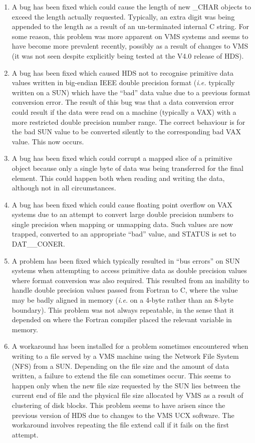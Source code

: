 \begin{enumerate}
\item
A bug has been fixed which could cause the length of new \_CHAR objects to
exceed the length actually requested. Typically, an extra digit was being
appended to the length as a result of an un-terminated internal C string. For
some reason, this problem was more apparent on VMS systems and seems to have
become more prevalent recently, possibly as a result of changes to VMS (it was
not seen despite explicitly being tested at the V4.0 release of HDS).

\item
A bug has been fixed which caused HDS not to recognise primitive data values
written in big-endian IEEE double precision format ({\em i.e.} typically written
on a SUN) which have the ``bad'' data value due to a previous format conversion
error. The result of this bug was that a data conversion error could result if
the data were read on a machine (typically a VAX) with a more restricted double
precision number range. The correct behaviour is for the bad SUN value to be
converted silently to the corresponding bad VAX value. This now occurs.

\item
A bug has been fixed which could corrupt a mapped slice of a primitive object
because only a single byte of data was being transferred for the final element.
This could happen both when reading and writing the data, although not in all
circumstances.

\item
A bug has been fixed which could cause floating point overflow on VAX systems
due to an attempt to convert large double precision numbers to single precision
when mapping or unmapping data. Such values are now trapped,  converted to an
appropriate ``bad'' value, and STATUS is set to DAT\_\_CONER.

\item
A problem has been fixed which typically resulted in ``bus errors'' on SUN
systems when attempting to access primitive data as double precision values
where format conversion was also required. This resulted from an inability to
handle double precision values passed from Fortran to C, where the value may be
badly aligned in memory ({\em i.e.} on a 4-byte rather than an 8-byte boundary).
This problem was not always repeatable, in the sense that it depended on where
the Fortran compiler placed the relevant variable in memory.

\item
A workaround has been installed for a problem sometimes encountered when writing
to a file served by a VMS machine using the Network File System (NFS) from a
SUN. Depending on the file size and the amount of data written, a failure to
extend the file can sometimes occur. This seems to happen only when the new file
size requested by the SUN lies between the current end of file and the physical
file size allocated by VMS as a result of clustering of disk blocks. This
problem seems to have arisen since the previous version of HDS due to changes to
the VMS UCX software. The workaround involves repeating the file extend call if
it fails on the first attempt.


\end{enumerate}

